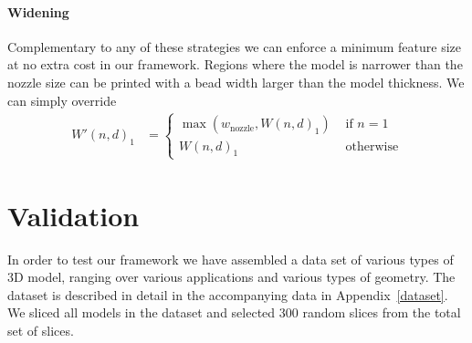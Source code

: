 \paragraph{Widening}
Complementary to any of these strategies we can enforce a minimum feature size at no extra cost in our framework.
Regions where the model is narrower than the nozzle size can be printed with a bead width larger than the model thickness.
We can simply override
\begin{align*}
W'(n,d)_1 &=
\begin{cases}
\max \left( w_\text{nozzle}  ,  W(n,d)_1 \right) & \text{ if } n = 1 \\
W(n,d)_1 & \text{ otherwise}
\end{cases}
\end{align*}




















\section{Validation}
In order to test our framework we have assembled a data set of various types of 3D model, ranging over various applications and various types of geometry.
The dataset is described in detail in the accompanying data in Appendix~\ref{dataset}.
We sliced all models in the dataset and selected 300 random slices from the total set of slices.



